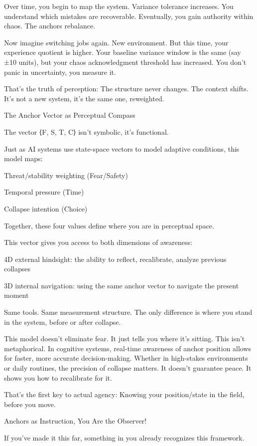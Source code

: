 \documentclass[11pt]{article}
\begin{document}
Over time, you begin to map the system. Variance tolerance increases. You understand which mistakes are recoverable. Eventually, you gain authority within chaos. The anchors rebalance.

Now imagine switching jobs again. New environment. But this time, your experience quotient is higher. Your baseline variance window is the same (say ±10 units), but your chaos acknowledgment threshold has increased. You don’t panic in uncertainty, you measure it.

That’s the truth of perception: The structure never changes. The context shifts.
It’s not a new system, it’s the same one, reweighted.


The Anchor Vector as Perceptual Compass

The vector ⟨F, S, T, C⟩ isn’t symbolic, it’s functional.

Just as AI systems use state-space vectors to model adaptive conditions, this model maps:

Threat/stability weighting (Fear/Safety)

Temporal pressure (Time)

Collapse intention (Choice)

Together, these four values define where you are in perceptual space.

This vector gives you access to both dimensions of awareness:

4D external hindsight: the ability to reflect, recalibrate, analyze previous collapses

3D internal navigation: using the same anchor vector to navigate the present moment

Same tools.
Same measurement structure.
The only difference is where you stand in the system, before or after collapse.

This model doesn’t eliminate fear. It just tells you where it’s sitting. This isn’t metaphorical. In cognitive systems, real-time awareness of anchor position allows for faster, more accurate decision-making. Whether in high-stakes environments or daily routines, the precision of collapse matters. It doesn’t guarantee peace. It shows you how to recalibrate for it.

That’s the first key to actual agency:
Knowing your position/state in the field, before you move. 

Anchors as Instruction, You Are the Observer!

If you’ve made it this far, something in you already recognizes this framework.
\end{document}
